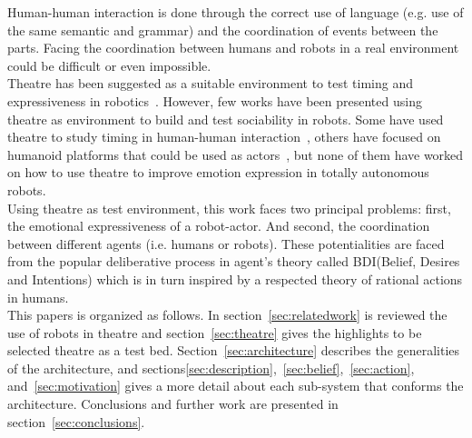 Human-human interaction is done through the correct use of language (e.g. use of the same semantic and grammar) and the coordination of events between the parts. Facing the coordination between humans and robots in a real environment could be difficult or even impossible.\\
Theatre has been suggested as a suitable environment to test timing and expressiveness in robotics~\cite{Breazeal2003,Fan2013,Hoffman2009,lu2011position,Pinhanez97}. However, few works have been presented using theatre as environment to build and test sociability in robots. Some have used theatre to study timing in human-human interaction~\cite{Knight2011,Knight2011b}, others have focused on humanoid platforms that could be used as actors~\cite{Fan2009,Fan2013}, but none of them have worked on how to use theatre to improve emotion expression in totally autonomous robots.\\
Using theatre as test environment, this work faces two principal problems: first, the emotional expressiveness of a robot-actor. And second, the coordination between different agents (i.e. humans or robots). These potentialities are faced from the popular deliberative process in agent's theory called BDI(Belief, Desires and Intentions) which is in turn inspired by a respected theory of rational actions in humans.\\
This papers is organized as follows. In section~\ref{sec:relatedwork} is reviewed the use of robots in theatre and section~\ref{sec:theatre} gives the highlights to be selected theatre as a test bed. Section~\ref{sec:architecture} describes the generalities of the architecture, and sections\ref{sec:description},~\ref{sec:belief},~\ref{sec:action}, and~\ref{sec:motivation} gives a more detail about each sub-system that conforms the architecture. Conclusions and further work are presented in section~\ref{sec:conclusions}. 

